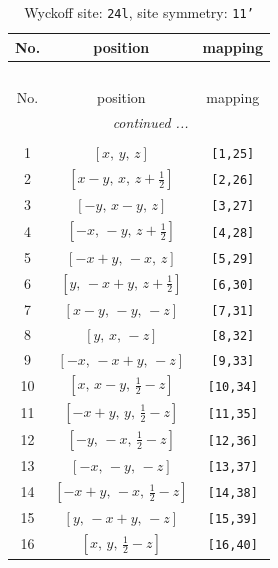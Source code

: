 \documentclass[fleqn,8pt]{jsarticle}
\begin{document}
\begin{longtable}{ccc}
\caption{Wyckoff site: {\tt 24l}, site symmetry: {\tt 11'}}
 \\
 \hline \hline
No. & position & mapping \\ \hline \endfirsthead

\multicolumn{2}{l}{\tablename\ \thetable{}} \\
 \hline \hline
No. & position & mapping \\ \hline \endhead

 \hline \hline
\multicolumn{2}{r}{\footnotesize\it continued ...} \\ \endfoot

 \hline \hline
\multicolumn{2}{r}{} \\ \endlastfoot

1 & $\left[ x,\, y,\, z \right]$ & {\tt [1,25]} \\ \hline
2 & $\left[ x - y,\, x,\, z + \frac{1}{2} \right]$ & {\tt [2,26]} \\ \hline
3 & $\left[ - y,\, x - y,\, z \right]$ & {\tt [3,27]} \\ \hline
4 & $\left[ - x,\, - y,\, z + \frac{1}{2} \right]$ & {\tt [4,28]} \\ \hline
5 & $\left[ - x + y,\, - x,\, z \right]$ & {\tt [5,29]} \\ \hline
6 & $\left[ y,\, - x + y,\, z + \frac{1}{2} \right]$ & {\tt [6,30]} \\ \hline
7 & $\left[ x - y,\, - y,\, - z \right]$ & {\tt [7,31]} \\ \hline
8 & $\left[ y,\, x,\, - z \right]$ & {\tt [8,32]} \\ \hline
9 & $\left[ - x,\, - x + y,\, - z \right]$ & {\tt [9,33]} \\ \hline
10 & $\left[ x,\, x - y,\, \frac{1}{2} - z \right]$ & {\tt [10,34]} \\ \hline
11 & $\left[ - x + y,\, y,\, \frac{1}{2} - z \right]$ & {\tt [11,35]} \\ \hline
12 & $\left[ - y,\, - x,\, \frac{1}{2} - z \right]$ & {\tt [12,36]} \\ \hline
13 & $\left[ - x,\, - y,\, - z \right]$ & {\tt [13,37]} \\ \hline
14 & $\left[ - x + y,\, - x,\, \frac{1}{2} - z \right]$ & {\tt [14,38]} \\ \hline
15 & $\left[ y,\, - x + y,\, - z \right]$ & {\tt [15,39]} \\ \hline
16 & $\left[ x,\, y,\, \frac{1}{2} - z \right]$ & {\tt [16,40]} \\ \hline

\end{longtable}
\end{document}
